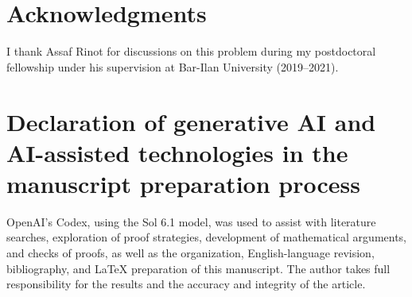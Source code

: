 \documentclass[11pt,a4paper]{amsart}
\theoremstyle{definition}
\theoremstyle{remark}
\begin{document}
\section*{Acknowledgments}
I thank Assaf Rinot for discussions on this problem during my
postdoctoral fellowship under his supervision at Bar-Ilan
University (2019--2021).

\section*{Declaration of generative AI and AI-assisted technologies
in the manuscript preparation process}
OpenAI's Codex, using the Sol 6.1 model, was used to assist
with literature searches, exploration of proof strategies,
development of mathematical arguments, and checks of proofs,
as well as the organization, English-language revision,
bibliography, and LaTeX preparation of this manuscript.
The author takes full responsibility for the results and the
accuracy and integrity of the article.
\end{document}

